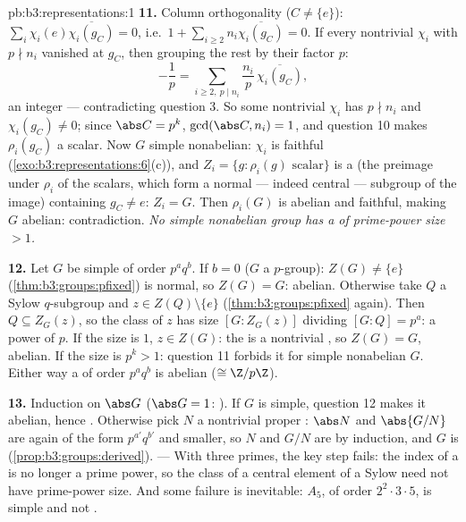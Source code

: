 \begin{solution}{pb:b3:representations:1}
\textbf{11.} Column orthogonality ($C \neq \{e\}$):
$\sum_i \chi_i(e)\overline{\chi_i(g_C)} = 0$, i.e.\ $1 +
\sum_{i \geq 2} n_i\overline{\chi_i(g_C)} = 0$. If every
nontrivial $\chi_i$ with $p \nmid n_i$ vanished at $g_C$, then
grouping the rest by their factor $p$:
\[
-\frac1p = \sum_{i \geq 2,\ p \mid n_i}
\frac{n_i}{p}\,\overline{\chi_i(g_C)},
\]
an  integer --- contradicting question 3. So some
nontrivial $\chi_i$ has $p \nmid n_i$ and $\chi_i(g_C) \neq 0$;
since $\abs C = p^k$, $\gcd(\abs C, n_i) = 1$, and question 10
makes $\rho_i(g_C)$ a scalar. Now $G$ simple nonabelian:
$\chi_i$ is faithful (\cref{exo:b3:representations:6}(c)), and
$Z_i = \{g : \rho_i(g) \text{ scalar}\}$ is a 
(the preimage under $\rho_i$ of the scalars, which form a
normal --- indeed central --- subgroup of the image) containing
$g_C \neq e$: $Z_i = G$. Then $\rho_i(G)$ is abelian and
faithful, making $G$ abelian: contradiction. \emph{No simple
nonabelian group has a  of prime-power size
$> 1$.}

\textbf{12.} Let $G$ be simple of order $p^aq^b$. If $b = 0$
($G$ a $p$-group): $Z(G) \neq \{e\}$
(\cref{thm:b3:groups:pfixed}) is normal, so $Z(G) = G$: abelian.
Otherwise take $Q$ a Sylow $q$-subgroup and $z \in Z(Q)
\setminus\{e\}$ (\cref{thm:b3:groups:pfixed} again). Then $Q
\subseteq Z_G(z)$, so the class of $z$ has size $[G : Z_G(z)]$
dividing $[G : Q] = p^a$: a power of $p$. If the size is $1$,
$z \in Z(G)$: the  is a nontrivial , so
$Z(G) = G$, abelian. If the size is $p^k > 1$: question 11
forbids it for simple nonabelian $G$. Either way a 
of order $p^aq^b$ is abelian ($\cong \Z/p\Z$).

\textbf{13.} Induction on $\abs G$ ($\abs G = 1$: ). If
$G$ is simple, question 12 makes it abelian, hence .
Otherwise pick $N$ a nontrivial proper : $\abs
N$ and $\abs{G/N}$ are again of the form $p^{a'}q^{b'}$ and
smaller, so $N$ and $G/N$ are  by induction, and $G$ is
 (\cref{prop:b3:groups:derived}). --- With three
primes, the key step fails: the index of a  is no
longer a prime power, so the class of a central element of a
Sylow need not have prime-power size. And some failure is
inevitable: $A_5$, of order $2^2\cdot3\cdot5$, is simple and
not .


\end{solution}
